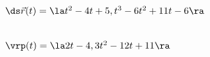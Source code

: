 {$\ds \vec r(t) = \la t^2-4t+5,t^3-6t^2+11t-6\ra$
}
{
\begin{minipage}{\linewidth}
\\
$\vrp(t) = \la 2t-4,3t^2-12t+11\ra$
\end{minipage}
}

